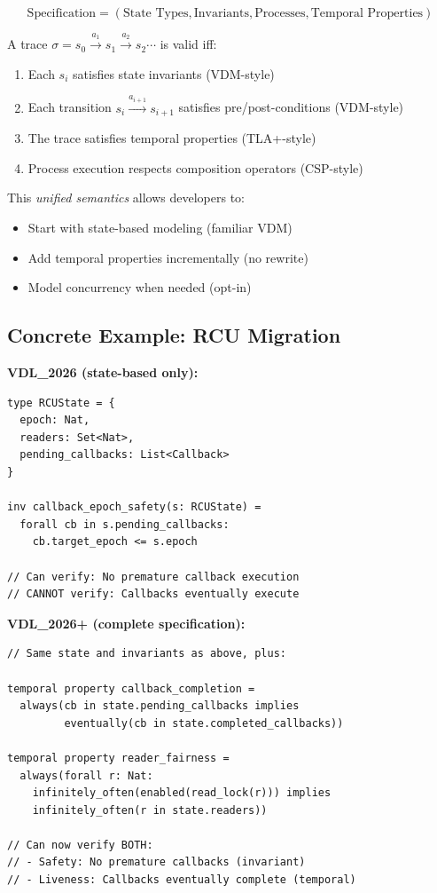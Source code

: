 \documentclass[11pt]{article}
\begin{document}
\begin{equation}
\text{Specification} = (\text{State Types}, \text{Invariants}, \text{Processes}, \text{Temporal Properties})
\end{equation}

A trace $\sigma = s_0 \xrightarrow{a_1} s_1 \xrightarrow{a_2} s_2 \cdots$ is valid iff:

\begin{enumerate}
\item Each $s_i$ satisfies state invariants (VDM-style)
\item Each transition $s_i \xrightarrow{a_{i+1}} s_{i+1}$ satisfies pre/post-conditions (VDM-style)
\item The trace satisfies temporal properties (TLA+-style)
\item Process execution respects composition operators (CSP-style)
\end{enumerate}

This \textit{unified semantics} allows developers to:

\begin{itemize}
\item Start with state-based modeling (familiar VDM)
\item Add temporal properties incrementally (no rewrite)
\item Model concurrency when needed (opt-in)
\end{itemize}

\subsection{Concrete Example: RCU Migration}

\textbf{VDL\_2026 (state-based only):}

\begin{lstlisting}[caption={RCU in VDL\_2026 (incomplete)}]
type RCUState = {
  epoch: Nat,
  readers: Set<Nat>,
  pending_callbacks: List<Callback>
}

inv callback_epoch_safety(s: RCUState) =
  forall cb in s.pending_callbacks:
    cb.target_epoch <= s.epoch

// Can verify: No premature callback execution
// CANNOT verify: Callbacks eventually execute
\end{lstlisting}

\textbf{VDL\_2026+ (complete specification):}

\begin{lstlisting}[caption={RCU in VDL\_2026+ (complete)}]
// Same state and invariants as above, plus:

temporal property callback_completion =
  always(cb in state.pending_callbacks implies
         eventually(cb in state.completed_callbacks))

temporal property reader_fairness =
  always(forall r: Nat:
    infinitely_often(enabled(read_lock(r))) implies
    infinitely_often(r in state.readers))

// Can now verify BOTH:
// - Safety: No premature callbacks (invariant)
// - Liveness: Callbacks eventually complete (temporal)
\end{lstlisting}
\end{document}
